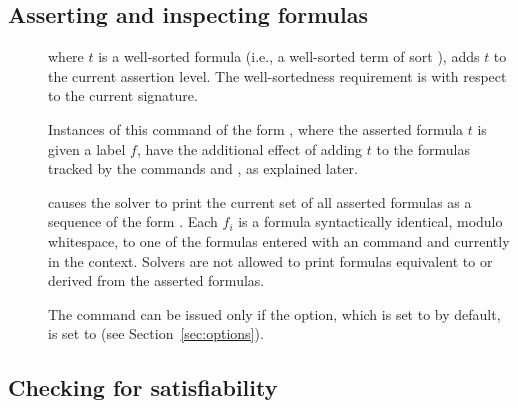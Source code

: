 \subsection{Asserting and inspecting formulas}

\begin{description}
%
\item[]
where $t$ is a well-sorted formula (i.e., a well-sorted term of sort ),
adds $t$ to the current assertion level.
The well-sortedness requirement is with respect to the current signature.

Instances of this command of the form , 
where the asserted formula $t$ is given a label $f$, 
have the additional effect of adding $t$ to the formulas tracked 
by the commands  and , as explained later.
\smallskip

%
\item[]
causes the solver to print the current set of all asserted formulas
as a sequence of the form .
Each $f_i$ is a formula syntactically identical, modulo whitespace, 
to one of the formulas entered with an  command and 
currently in the context.
Solvers are not allowed to print formulas equivalent to or derived from 
the asserted formulas.

The command can be issued only if the  option,
which is set to  by default, is set to  
(see Section~\ref{sec:options}).

\end{description}


\subsection{Checking for satisfiability} \label{sec:checking-for-sat}


